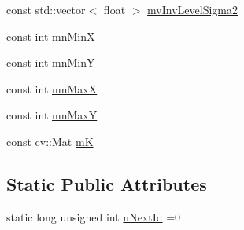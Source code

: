 \begin{DoxyCompactItemize}
\item 
const std\+::vector$<$ float $>$ \mbox{\hyperlink{class_o_r_b___s_l_a_m2_1_1_key_frame_a320d543b9585072c264b4e6f7e334bad}{mv\+Inv\+Level\+Sigma2}}
\item 
const int \mbox{\hyperlink{class_o_r_b___s_l_a_m2_1_1_key_frame_a02b00239e47ff44e5578c2eeaf3d3cc8}{mn\+MinX}}
\item 
const int \mbox{\hyperlink{class_o_r_b___s_l_a_m2_1_1_key_frame_ab96accf480c4bbc3212efb47278db8c5}{mn\+MinY}}
\item 
const int \mbox{\hyperlink{class_o_r_b___s_l_a_m2_1_1_key_frame_a677fd210bec35232bda003b543d0acfc}{mn\+MaxX}}
\item 
const int \mbox{\hyperlink{class_o_r_b___s_l_a_m2_1_1_key_frame_ababbbd404314965b13a51e6414dce6ad}{mn\+MaxY}}
\item 
const cv\+::\+Mat \mbox{\hyperlink{class_o_r_b___s_l_a_m2_1_1_key_frame_afcb8246d60511b756ba241de680e96ac}{mK}}
\end{DoxyCompactItemize}
\subsection*{Static Public Attributes}
\begin{DoxyCompactItemize}
\item 
static long unsigned int \mbox{\hyperlink{class_o_r_b___s_l_a_m2_1_1_key_frame_acb0d220936541a8afc020a65aa675559}{n\+Next\+Id}} =0
\end{DoxyCompactItemize}

